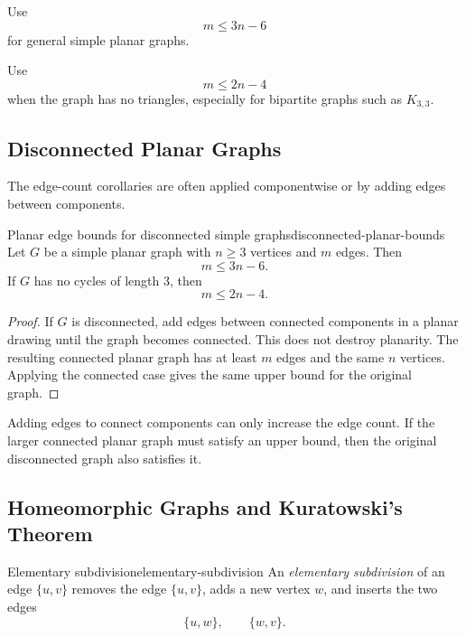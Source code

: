 \begin{examtip}[title={Choosing the right edge bound}]
Use
\[
m\le 3n-6
\]
for general simple planar graphs.

Use
\[
m\le 2n-4
\]
when the graph has no triangles, especially for bipartite graphs such as \(K_{3,3}\).
\end{examtip}

\subsection{Disconnected Planar Graphs}

The edge-count corollaries are often applied componentwise or by adding edges between components.

\begin{theorem}{Planar edge bounds for disconnected simple graphs}{disconnected-planar-bounds}
Let \(G\) be a simple planar graph with \(n\ge 3\) vertices and \(m\) edges. Then
\[
m\le 3n-6.
\]
If \(G\) has no cycles of length \(3\), then
\[
m\le 2n-4.
\]
\end{theorem}

\begin{proof}
If \(G\) is disconnected, add edges between connected components in a planar drawing until the graph becomes connected. This does not destroy planarity. The resulting connected planar graph has at least \(m\) edges and the same \(n\) vertices. Applying the connected case gives the same upper bound for the original graph.
\end{proof}

\begin{extension}[title={Why adding edges can help prove an upper bound}]
Adding edges to connect components can only increase the edge count. If the larger connected planar graph must satisfy an upper bound, then the original disconnected graph also satisfies it.
\end{extension}

\subsection{Homeomorphic Graphs and Kuratowski's Theorem}

\begin{definition}{Elementary subdivision}{elementary-subdivision}
An \emph{elementary subdivision} of an edge \(\{u,v\}\) removes the edge \(\{u,v\}\), adds a new vertex \(w\), and inserts the two edges
\[
\{u,w\},\qquad \{w,v\}.
\]
\end{definition}

